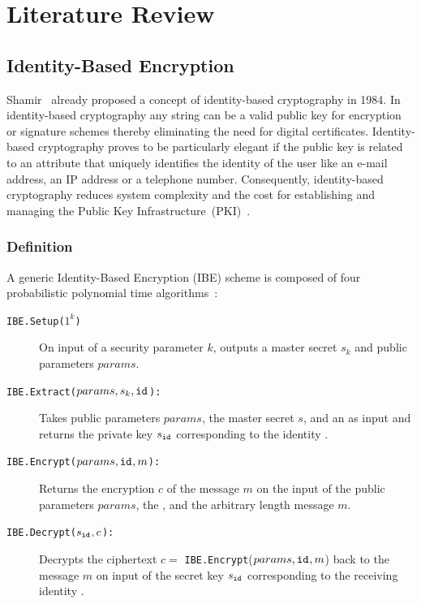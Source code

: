 \chapter{Literature Review}
\label{cha:2}

\section{Identity-Based Encryption}
Shamir~\cite{art:Shamir84} already proposed a concept of identity-based cryptography in 1984. In identity-based cryptography any string can be a valid public key for encryption or signature schemes thereby eliminating the need for digital certificates. Identity-based cryptography proves to be particularly elegant if the public key is related to an attribute that uniquely identifies the identity of the user like an e-mail address, an IP address or a telephone number. Consequently, identity-based cryptography reduces system complexity and the cost for establishing and managing the Public Key Infrastructure~(PKI)~\cite{art:BaekNSS04}. 


\subsection{Definition}
A generic Identity-Based Encryption (IBE) scheme is composed of four probabilistic polynomial time algorithms~\cite{art:BonehF01}:
\begin{description}
    \item[\texttt{IBE.Setup($1^k$)}] On input of a security parameter $k$, outputs a master secret $s_k$ and public parameters $params$.
    \item[\texttt{IBE.Extract($params, s_k, \mathtt{id}_{}$):}] Takes public parameters $params$, the master secret $s$, and an \id{} as input and returns the private key $s_{\mathtt{id}_{}}$ corresponding to the identity \id{}.
    \item[\texttt{IBE.Encrypt($params, \mathtt{id}_{}, m$):}] Returns the encryption $c$ of the message $m$ on the input of the public parameters $params$, the \id{}, and the arbitrary length message $m$.
    \item[\texttt{IBE.Decrypt($s_{\mathtt{id}_{}}, c$):}] Decrypts the ciphertext $c =$ \texttt{IBE.Encrypt}($params, \mathtt{id}_{}, m$) back to the message $m$ on input of the secret key $s_{\mathtt{id}_{}}$ corresponding to the receiving identity \id{}.
\end{description}

